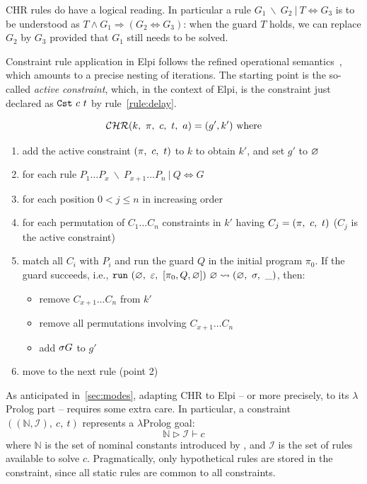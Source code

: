 \documentclass{these-ISSS}
\begin{document}
CHR rules do have a logical reading. 
In particular a rule $G_1\ \backslash\ G_2\ |\ T \Leftrightarrow G_3$
is to be understood as $T \land G_1 \Rightarrow (G_2
\Leftrightarrow G_3)$: when the guard $T$ holds, we can replace $G_2$ by $G_3$
provided that $G_1$ still needs to be solved.

Constraint rule application in Elpi follows the refined operational
semantics~\cite{10.1007/978-3-540-27775-0_7}, which amounts to a precise
nesting of iterations.
The starting point is the so-called \emph{active constraint}, which, in the context
of Elpi, is the constraint just declared as $\cst\ c\ t$ by rule~\ref{rule:delay}.

$$
\mathcal{CHR}(k,\ {\pi},\ c,\ t,\ a) = (g', k')\ \mathrm{where}
$$
\begin{enumerate}
\item add the active constraint $(\prog,\ c,\ t)$ to $k$ to obtain $k'$, and set $g'$ to $\varnothing$
\item for each rule $P_1 \ldots P_x\ \backslash\ P_{x+1} \ldots P_n\ |\ Q \Leftrightarrow G$
\item for each position $0 < j \leq n$ in increasing order
\item for each permutation of $C_1 \ldots C_n$ constraints in $k'$ having $C_j = ({\pi},\ c,\ t)$ ($C_j$ is
the active constraint)
\item match all $C_i$ with $P_i$ and run the guard $Q$ in the initial program $\pi_0$.
  If the guard succeeds, i.e., $\texttt{run}\ (\varnothing,\ \varepsilon,\ [\pi_0,Q,\varnothing])\ \varnothing \rightsquigarrow (\varnothing,\ \sigma,\ \_)$, then:
  \begin{itemize}
    \item remove $C_{x+1} \ldots C_n$ from $k'$
    \item remove all permutations involving $C_{x+1} \ldots C_n$
    \item add $\sigma G$ to $g'$
  \end{itemize}
\item move to the next rule (point 2)
\end{enumerate}


 As
anticipated in~\cref{sec:modes}, adapting CHR to Elpi -- or more precisely, to its
$\lambda$Prolog part -- requires some extra care. In particular, a constraint
$((\mathbb{N},\mathcal{I}),\ c,\ t)$ represents a $\lambda$Prolog goal:
$$
\mathbb{N} \triangleright  \mathcal{I} \vdash c
$$
where $\mathbb{N}$ is the set of nominal constants introduced by , and
$\mathcal{I}$ is the set of rules available to solve $c$. Pragmatically, only
hypothetical rules are stored in the constraint, since all static rules are
common to all constraints.
\end{document}
